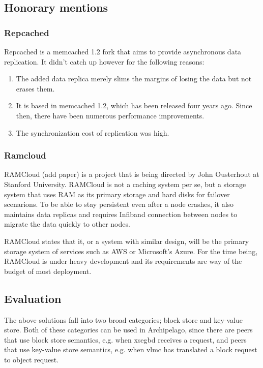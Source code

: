 \subsection{Honorary mentions}

\subsubsection{Repcached}

Repcached is a memcached 1.2 fork that aims to provide asynchronous data 
replication. It didn't catch up however for the following reasons:

\begin{enumerate}
	\item The added data replica merely slims the margins of losing the data 
		but not erases them.
	\item It is based in memcached 1.2, which has been released four years ago.  
		Since then, there have been numerous performance improvements.
	\item The synchronization cost of replication was high.
\end{enumerate}

\subsubsection{Ramcloud}

RAMCloud (\fixme add paper) is a project that is being directed by John 
Ousterhout at Stanford University. RAMCloud is not a caching system per se, but 
a storage system that uses RAM as its primary storage and hard disks for 
failover scenarions. To be able to stay persistent even after a node crashes, 
it also maintains data replicas and requires Infiband connection between nodes 
to migrate the data quickly to other nodes.

RAMCloud states that it, or a system with similar design, will be the primary 
storage system of services such as AWS or Microsoft's Azure. For the time 
being, RAMCloud is under heavy development and its requirements are way of the 
budget of most deployment.


\subsection{Evaluation}

The above solutions fall into two broad categories; block store and key-value 
store. Both of these categories can be used in Archipelago, since there are 
peers that use block store semantics, e.g.  when xsegbd receives a request, and 
peers that use key-value store semantics, e.g.  when vlmc has translated a 
block request to object request.

